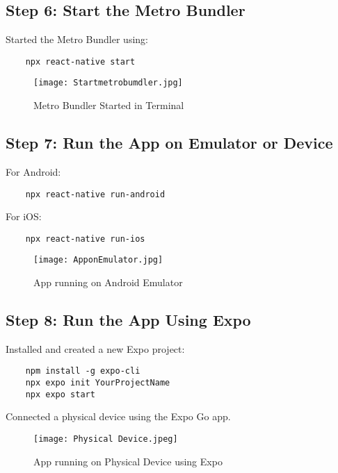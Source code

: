 \documentclass{article}
\begin{document}
\subsection{Step 6: Start the Metro Bundler}
Started the Metro Bundler using:
\begin{verbatim}
    npx react-native start
\end{verbatim}

\begin{figure}[H]
    \centering
    \texttt{[image: Startmetrobumdler.jpg]}
    \caption{Metro Bundler Started in Terminal}
    \label{fig:metro_bundler}
\end{figure}

\subsection{Step 7: Run the App on Emulator or Device}
For Android:
\begin{verbatim}
    npx react-native run-android
\end{verbatim}
For iOS:
\begin{verbatim}
    npx react-native run-ios
\end{verbatim}

\begin{figure}[H]
    \centering
    \texttt{[image: ApponEmulator.jpg]}
    \caption{App running on Android Emulator}
    \label{fig:emulator}
\end{figure}

\subsection{Step 8: Run the App Using Expo}
Installed and created a new Expo project:
\begin{verbatim}
    npm install -g expo-cli
    npx expo init YourProjectName
    npx expo start
\end{verbatim}
Connected a physical device using the Expo Go app.

\begin{figure}[H]
    \centering
    \texttt{[image: Physical Device.jpeg]}
    \caption{App running on Physical Device using Expo}
    \label{fig:expo_device}
\end{figure}
\end{document}
